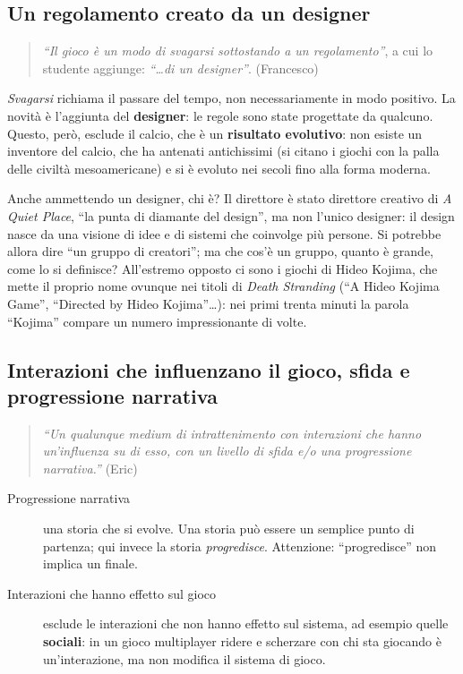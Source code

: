 \subsection{Un regolamento creato da un designer}

\begin{quote}
\emph{``Il gioco è un modo di svagarsi sottostando a un regolamento''},
a cui lo studente aggiunge: \emph{``\dots di un designer''}. (Francesco)
\end{quote}

\emph{Svagarsi} richiama il passare del tempo, non necessariamente in modo
positivo. La novità è l'aggiunta del \textbf{designer}: le regole sono state
progettate da qualcuno. Questo, però, esclude il calcio, che è un
\textbf{risultato evolutivo}: non esiste un inventore del calcio, che ha
antenati antichissimi (si citano i giochi con la palla delle civiltà
mesoamericane) e si è evoluto nei secoli fino alla forma moderna.

Anche ammettendo un designer, chi è? Il direttore è stato direttore creativo
di \emph{A Quiet Place}, ``la punta di diamante del design'', ma non l'unico
designer: il design nasce da una visione di idee e di sistemi che coinvolge
più persone. Si potrebbe allora dire ``un gruppo di creatori''; ma che cos'è un
gruppo, quanto è grande, come lo si definisce? All'estremo opposto ci sono i
giochi di Hideo Kojima, che mette il proprio nome ovunque nei titoli di
\emph{Death Stranding} (``A Hideo Kojima Game'', ``Directed by Hideo
Kojima''\dots): nei primi trenta minuti la parola ``Kojima'' compare un numero
impressionante di volte.

\subsection{Interazioni che influenzano il gioco, sfida e progressione narrativa}

\begin{quote}
\emph{``Un qualunque medium di intrattenimento con interazioni che hanno
un'influenza su di esso, con un livello di sfida e/o una progressione
narrativa.''} (Eric)
\end{quote}

\begin{description}
  \item[Progressione narrativa] una storia che si evolve. Una storia può
        essere un semplice punto di partenza; qui invece la storia
        \emph{progredisce}. Attenzione: ``progredisce'' non implica un
        finale.
  \item[Interazioni che hanno effetto sul gioco] esclude le interazioni che
        non hanno effetto sul sistema, ad esempio quelle \textbf{sociali}: in
        un gioco multiplayer ridere e scherzare con chi sta giocando è
        un'interazione, ma non modifica il sistema di gioco.
\end{description}

